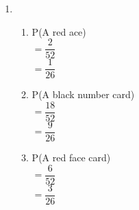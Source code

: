 \begin{enumerate}[label = \arabic*. ]
\item %
\begin{enumerate}[label = \alph*. ]
\item  P(A red ace) \redcheck \\ 
$= \dfrac{2}{52}$ \redcheck \\ 
$= \dfrac{1}{26}$ \redcheck \\ 
\item  P(A black number card)  \redcheck \\ 
$= \dfrac{18}{52}$ \redcheck \\ 
$= \dfrac{9}{26}$ \redcheck \\ 
\item  P(A red face card) \redcheck \\ 
$= \dfrac{6}{52}$ \redcheck \\ 
$= \dfrac{3}{26}$ \redcheck \\ 
\end{enumerate} 

\end{enumerate}  

